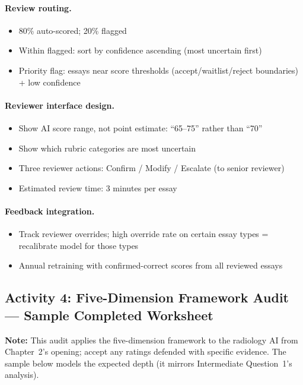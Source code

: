 \paragraph{Review routing.}
\begin{itemize}
    \item 80\% auto-scored; 20\% flagged
    \item Within flagged: sort by confidence ascending (most uncertain first)
    \item Priority flag: essays near score thresholds (accept/waitlist/reject boundaries) + low confidence
\end{itemize}

\paragraph{Reviewer interface design.}
\begin{itemize}
    \item Show AI score range, not point estimate: ``65--75'' rather than ``70''
    \item Show which rubric categories are most uncertain
    \item Three reviewer actions: Confirm / Modify / Escalate (to senior reviewer)
    \item Estimated review time: 3 minutes per essay
\end{itemize}

\paragraph{Feedback integration.}
\begin{itemize}
    \item Track reviewer overrides; high override rate on certain essay types = recalibrate model for those types
    \item Annual retraining with confirmed-correct scores from all reviewed essays
\end{itemize}

\subsection{Activity 4: Five-Dimension Framework Audit --- Sample Completed Worksheet}

\textbf{Note:} This audit applies the five-dimension framework to the radiology AI from Chapter~2's opening; accept any ratings defended with specific evidence. The sample below models the expected depth (it mirrors Intermediate Question~1's analysis).

